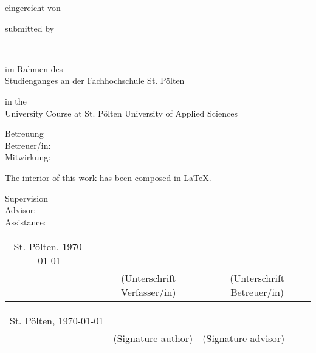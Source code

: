 {\begin{titlepage}
{\ifisGerman
\begin{center}\large{eingereicht von}\end{center}%
\else
\begin{center}\large{submitted by}\end{center}%
\fi

\vspace*{-0.5cm}%
\begin{center}\LARGE{\@author\\\@matnr}\end{center}

\footnotesize
\vspace*{.5cm}

\ifisGerman
\begin{flushleft}
	im Rahmen des \\ 
	Studienganges {\@study} an der Fachhochschule St. P\"olten
\end{flushleft}
\else
\begin{flushleft}
	in the \\ 
	University Course {\@study} at St. P\"olten University of Applied Sciences
\end{flushleft}
\fi

\vspace{0.3cm}

\ifisGerman
\begin{flushleft}
	Betreuung \\
	Betreuer/in: \@supervisor \\
	Mitwirkung: \@assistance
\end{flushleft}
\else
\begin{flushleft}
The interior of this work has been composed in \LaTeX.
\end{flushleft}
\begin{flushleft}
	Supervision \\
	Advisor: \@supervisor \\
	Assistance: \@assistance
\end{flushleft}
\fi

\vspace*{0.5cm}

{\centering
	\ifisGerman
	\begin{tabular}{ccc}
		St. P\"olten, \today & \underline{\hspace*{5cm}} & \underline{\hspace*{5cm}} \\
		& (Unterschrift Verfasser/in) & (Unterschrift Betreuer/in) \\
	\end{tabular}
	\else
	\begin{tabular}{ccc}
		St. P\"olten, \today & \underline{\hspace*{5cm}} & \underline{\hspace*{5cm}} \\
		& (Signature author) & (Signature advisor) \\
	\end{tabular}
	\fi
}

}
\end{titlepage}}
